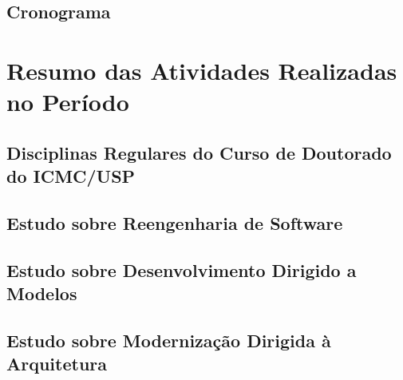 \documentclass[a4paper,11pt]{article}
\begin{document}
		\subsection{Cronograma}\label{cronograma}
			

\section{Resumo das Atividades Realizadas no Período}\label{atividades_realizadas}

	



	\subsection{Disciplinas Regulares do Curso de Doutorado do ICMC/USP} %
		\label{sub:disciplinas_regulares_do_curso_de_doutorado_do_icmc_usp}
		 
		 
	
	\subsection{Estudo sobre Reengenharia de Software} %
	\label{sub:estudo_sobre_reengenharia_de_software}
		 
		 
		
	 \subsection{Estudo sobre Desenvolvimento Dirigido a Modelos} %
	 	\label{sub:estudo_sobre_desenvolvimento_dirigido_a_modelos}
	 	
	 	

	 \subsection{Estudo sobre Modernização Dirigida à Arquitetura} %
	 \label{sub:estudo_sobre_moderniza_o_dirigida_arquitetura}
	 	
\end{document}
